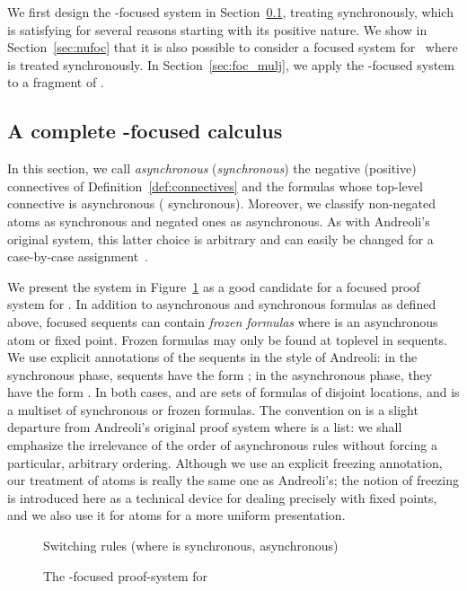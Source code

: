 We first design the -focused system in Section~\ref{sec:mufoc},
treating  synchronously,
which is satisfying for several reasons starting with its positive nature.
We show in Section~\ref{sec:nufoc} that it is also possible to consider
a focused system for \mumall\ where  is treated synchronously.
In Section~\ref{sec:foc_mulj}, we apply the -focused system
to a fragment of \muLJ.

\subsection{A complete -focused calculus} \label{sec:mufoc}

In this section,
we call \emph{asynchronous} (\resp \emph{synchronous})
the negative (\resp positive) connectives of Definition~\ref{def:connectives}
and the formulas whose top-level connective is asynchronous (\resp 
synchronous).
Moreover, we classify non-negated atoms as synchronous and negated
ones as asynchronous. As with Andreoli's original system, this latter choice
is arbitrary and can easily be changed for a case-by-case 
assignment~\cite{miller07cslb,chaudhuri08jar}.

We present the system in Figure~\ref{fig:focused} as a good
candidate for a focused proof system for \mumall.
In addition to asynchronous and synchronous formulas as defined above,
focused sequents can contain \emph{frozen formulas} 
where  is an asynchronous atom or fixed point.
Frozen formulas may only be found at toplevel in sequents.
We use explicit annotations of the sequents in the style of Andreoli:
in the synchronous phase, sequents have the form
;
in the asynchronous phase, they have the form
.
In both cases,
 and  are sets of formulas of disjoint locations,
and  is a multiset of synchronous or frozen formulas.
The convention on  is a slight departure from Andreoli's
original proof system where  is a list: we shall emphasize
the irrelevance of the order of asynchronous rules without
forcing a particular, arbitrary ordering.
Although we use an explicit freezing annotation,
our treatment of atoms is really the same one as Andreoli's;
the notion of freezing is introduced here as a technical device for
dealing precisely with fixed points,
and we also use it for atoms for a more uniform presentation.

\begin{figure}[htpb]
\begin{center}


\vspace{10pt}


\vspace{10pt}
Switching rules (where  is synchronous,  asynchronous)

\end{center}
\caption{The -focused proof-system for \mumall}
\label{fig:focused}
\end{figure}


